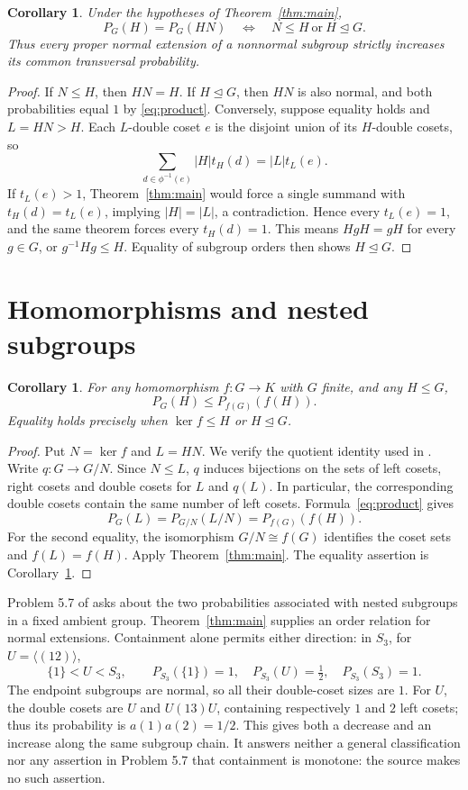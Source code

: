 \documentclass[11pt]{article}
\newtheorem{corollary}[theorem]{Corollary}
\newcommand{\PP}{P}
\begin{document}
\begin{corollary}\label{cor:equality}
Under the hypotheses of Theorem~\ref{thm:main},
\[
 \PP_G(H)=\PP_G(HN)
 \quad\Longleftrightarrow\quad
 N\leq H\ \text{or}\ H\trianglelefteq G.
\]
Thus every proper normal extension of a nonnormal subgroup strictly
increases its common transversal probability.
\end{corollary}
\begin{proof}
If $N\leq H$, then $HN=H$. If $H\trianglelefteq G$, then $HN$ is also
normal, and both probabilities equal $1$ by \eqref{eq:product}.
Conversely, suppose equality holds and $L=HN>H$. Each $L$-double coset $e$
is the disjoint union of its $H$-double cosets, so
\[
 \sum_{d\in\phi^{-1}(e)}|H|t_H(d)=|L|t_L(e).
\]
If $t_L(e)>1$, Theorem~\ref{thm:main} would force a single summand with
$t_H(d)=t_L(e)$, implying $|H|=|L|$, a contradiction. Hence every $t_L(e)=1$,
and the same theorem forces every $t_H(d)=1$. This means $HgH=gH$ for every
$g\in G$, or $g^{-1}Hg\leq H$. Equality of subgroup orders then shows
$H\trianglelefteq G$.
\end{proof}

\section{Homomorphisms and nested subgroups}
\begin{corollary}\label{cor:image}
For any homomorphism $f:G\to K$ with $G$ finite, and any $H\leq G$,
\[
 \PP_G(H)\leq\PP_{f(G)}(f(H)).
\]
Equality holds precisely when $\ker f\leq H$ or $H\trianglelefteq G$.
\end{corollary}
\begin{proof}
Put $N=\ker f$ and $L=HN$. We verify the quotient identity used in
\cite[Theorem 3.15 and equation (5.1)]{ALM}.
Write $q:G\to G/N$. Since $N\leq L$, $q$ induces bijections on the sets
of left cosets, right cosets and double cosets for $L$ and $q(L)$.
In particular, the corresponding double cosets contain the same number
of left cosets. Formula~\eqref{eq:product} gives
\[
 \PP_G(L)=\PP_{G/N}(L/N)=\PP_{f(G)}(f(H)).
\]
For the second equality, the isomorphism $G/N\cong f(G)$ identifies
the coset sets and $f(L)=f(H)$. Apply Theorem~\ref{thm:main}.
The equality assertion is Corollary~\ref{cor:equality}.
\end{proof}

Problem 5.7 of \cite{ALM} asks about the two probabilities associated with
nested subgroups in a fixed ambient group. Theorem~\ref{thm:main} supplies
an order relation for normal extensions. Containment alone permits either
direction: in $S_3$, for $U=\langle(12)\rangle$,
\[
 \{1\}<U<S_3,\qquad
 \PP_{S_3}(\{1\})=1,\quad \PP_{S_3}(U)=\tfrac12,\quad
 \PP_{S_3}(S_3)=1.
\]
The endpoint subgroups are normal, so all their double-coset sizes are $1$.
For $U$, the double cosets are $U$ and $U(13)U$, containing respectively
$1$ and $2$ left cosets; thus its probability is $a(1)a(2)=1/2$.
This gives both a decrease and an increase along the same subgroup chain.
It answers neither a general classification nor any assertion in Problem 5.7
that containment is monotone: the source makes no such assertion.
\end{document}
